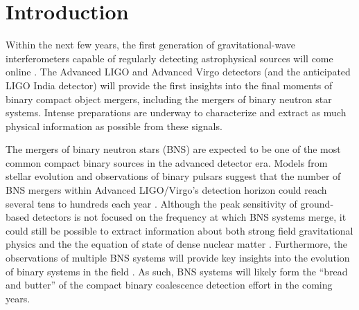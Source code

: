 \documentclass[11pt,a4paper]{emulateapj} 
\newcommand{\will}[1]{{\color{cyan} #1}}
\begin{document}
\maketitle
\section{Introduction}

Within the next few years, the first generation of gravitational-wave
interferometers capable of regularly detecting astrophysical sources will
come online \citep{AdvLIGO,AdvVirgo}.  The Advanced LIGO and Advanced Virgo
detectors (and the anticipated LIGO India detector)
 will provide the first insights into the final moments of
binary compact object mergers, including the mergers of binary neutron
star systems.  Intense preparations are underway to characterize and
extract as much physical information as possible from these signals.
 
The mergers of binary neutron stars (BNS) are expected to be one of the most
common compact binary sources in the advanced detector era.  %
  Models from stellar
evolution and observations of binary pulsars suggest that the number
of BNS mergers within Advanced LIGO/Virgo's detection
horizon could reach several tens to hundreds each year
\citep{RatesPaper}.  Although the peak sensitivity of ground-based
detectors is not focused on the frequency at which BNS systems merge,
it could still be possible to extract information about both strong
field gravitational physics \citep{Li2012} and the the equation of state of
dense nuclear matter
\citep{HindererBNS2010}.  Furthermore, the observations of multiple BNS systems
will provide key insights into the evolution of binary systems in the
field \citep{VickyRates,KimRates,OsowskiRates2011,RichardRates2010} . As such, BNS systems will likely
form the ``bread and butter'' of the compact binary coalescence
detection effort in the coming years.
\end{document}
